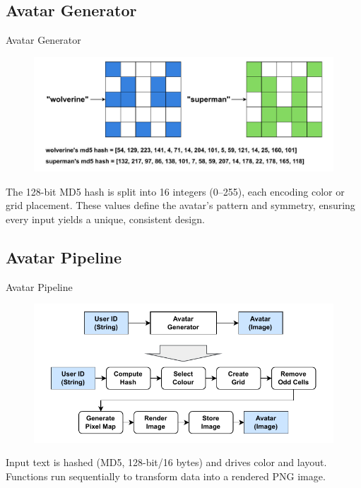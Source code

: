 \documentclass[aspectratio=169, table]{beamer}
\begin{document}
\subsection{Avatar Generator}
\begin{frame}[fragile]{Avatar Generator}
\begin{figure}
  \centering
  \includegraphics[width=\linewidth]{../../assets/avatar-example.pdf}
\end{figure}
\vspace{-10pt}
The 128-bit MD5 hash is split into 16 integers (0–255), each encoding color or grid placement.  
These values define the avatar’s pattern and symmetry, ensuring every input yields a unique, consistent design.


\end{frame}

\subsection{Avatar Pipeline}

\begin{frame}[fragile]{Avatar Pipeline}
\begin{figure}
  \centering
  \includegraphics[width=.88\linewidth]{../../assets/avatar-pipeline.pdf}
\end{figure}
Input text is hashed (MD5, 128-bit/16 bytes) and drives color and layout. Functions run sequentially to transform data into a rendered PNG image.
\end{frame}
\end{document}
